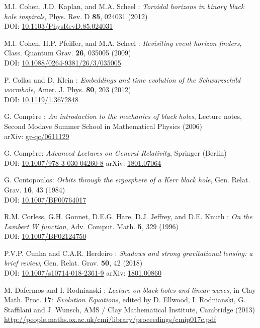 \begin{thebibliography}{123}
M.I. Cohen, J.D. Kaplan, and M.A. Scheel :
{\em Toroidal horizons in binary black hole inspirals},
Phys. Rev. D {\bf 85}, 024031 (2012)\\
DOI:  \href{https://doi.org/10.1103/PhysRevD.85.024031}{10.1103/PhysRevD.85.024031}

M.I. Cohen, H.P. Pfeiffer, and M.A. Scheel :
{\em Revisiting event horizon finders},
Class. Quantum Grav. {\bf 26}, 035005 (2009)\\
DOI: \href{https://doi.org/10.1088/0264-9381/26/3/035005}{10.1088/0264-9381/26/3/035005}

P. Collas and D. Klein :
{\em Embeddings and time evolution of the Schwarzschild wormhole},
Amer. J. Phys. {\bf 80}, 203 (2012)\\
DOI: \href{https://doi.org/10.1119/1.3672848}{10.1119/1.3672848}

G. Compère :
{\em An introduction to the mechanics of black holes},
Lecture notes, Second Modave Summer School in Mathematical Physics (2006)\\
arXiv: \href{https://arxiv.org/abs/gr-qc/0611129}{gr-qc/0611129}

G. Compère:
{\em Advanced Lectures on General Relativity},
Springer (Berlin)\\
DOI: \href{https://doi.org/10.1007/978-3-030-04260-8}{10.1007/978-3-030-04260-8}\hfill
arXiv: \href{https://arxiv.org/abs/1801.07064}{1801.07064}

G. Contopoulos:
{\em Orbits through the ergosphere of a Kerr black hole},
Gen. Relat. Grav. {\bf 16}, 43 (1984)\\
DOI: \href{https://doi.org/10.1007/BF00764017}{10.1007/BF00764017}

R.M. Corless, G.H. Gonnet, D.E.G. Hare, D.J. Jeffrey, and D.E. Knuth :
{\em On the Lambert W function},
Adv. Comput. Math. {\bf 5}, 329 (1996)\\
DOI: \href{https://doi.org/10.1007/BF02124750}{10.1007/BF02124750}

P.V.P. Cunha and C.A.R. Herdeiro :
{\em Shadows and strong gravitational lensing: a brief review},
Gen. Relat. Grav. {\bf 50}, 42 (2018)\\
DOI: \href{https://doi.org/10.1007/s10714-018-2361-9}{10.1007/s10714-018-2361-9}
\hfill
arXiv: \href{https://arxiv.org/abs/1801.00860}{1801.00860}

M. Dafermos and I. Rodnianski : {\em Lecture on black holes and linear waves},
in  Clay Math. Proc. {\bf 17}: {\em Evolution Equations}, edited by
D. Ellwood, I. Rodnianski, G. Staffilani and J. Wunsch, AMS / Clay Mathematical Institute,
Cambridge (2013) \\
\url{http://people.maths.ox.ac.uk/cmi/library/proceedings/cmip017c.pdf}


\end{thebibliography}
